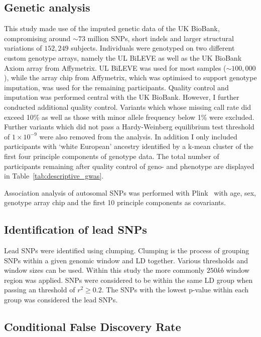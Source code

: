 \subsection{Genetic analysis}
\label{sub:genetic_analysis}
This study made use of the imputed genetic data of the UK BioBank, compromising around $\sim73$ million SNPs, short indels and larger structural variations of $152,249$ subjects.
Individuals were genotyped on two different custom genotype arrays, namely the UL BiLEVE as well as the UK BioBank Axiom array from Affymetrix. 
UL BiLEVE was used for most samples ($\sim100,000$), while the array chip from Affymetrix, which was optimised to support genotype imputation, was used for the remaining participants. 
Quality control and imputation was performed central with the UK BioBank.
However, I further conducted additional quality control.
Variants which whose missing call rate did exceed 10\% as well as those with minor allele frequency below 1\% were excluded.
Further variants which did not pass a Hardy-Weinberg equilibrium test threshold of $1\times10^{-9}$ were also removed from the analysis.
In addition I only included participants with `white European' ancestry identified by a k-mean cluster of the first four principle components of genotype data.
The total number of participants remaining after quality control of geno- and phenotype are displayed in Table~\ref{tab:descriptive_gwas}.

Association analysis of autosomal SNPs was performed with Plink~\cite{Purcell2007,Chang2015} with age, sex, genotype array chip and the first 10 principle components as covariants.

\subsection{Identification of lead SNPs}
\label{sub:Clumping}

Lead SNPs were identified using clumping.
Clumping is the process of grouping SNPs within a given genomic window and LD together.
Various thresholds and window sizes can be used.
Within this study the more commonly $250kb$ window region was applied.
SNPs were considered to be within the same LD group when passing an threshold of $r^2 \ge 0.2$.
The SNPs with the lowest p-value within each group was considered the lead SNPs.

\subsection{Conditional False Discovery Rate}
\label{sub:conditional_false_discovery_rate}

